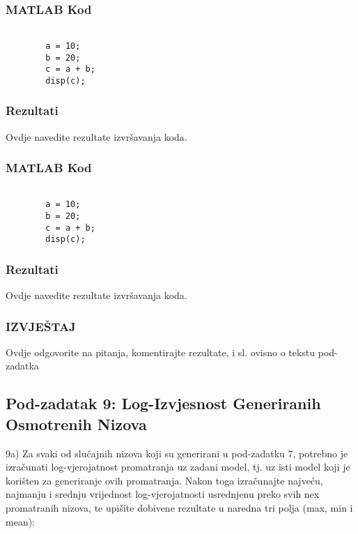 \documentclass[12pt]{article}
\begin{document}
	\subsubsection*{MATLAB Kod}
	\begin{lstlisting}
		
		a = 10;
		b = 20;
		c = a + b;
		disp(c);
	\end{lstlisting}
	
	\subsubsection*{Rezultati}
	Ovdje navedite rezultate izvršavanja koda.\newline
	
	\subsubsection*{MATLAB Kod}
	\begin{lstlisting}
		
		a = 10;
		b = 20;
		c = a + b;
		disp(c);
	\end{lstlisting}
	
	\subsubsection*{Rezultati}
	Ovdje navedite rezultate izvršavanja koda.\newline
	
	\subsubsection*{IZVJEŠTAJ}
	Ovdje odgovorite na pitanja, komentirajte rezultate, i sl. ovisno o tekstu pod-zadatka
	
	\subsection{Pod-zadatak 9: Log-Izvjesnost Generiranih Osmotrenih Nizova}
	9a) Za svaki od slučajnih nizova koji su generirani u pod-zadatku 7, potrebno je izračunati log-vjerojatnost promatranja uz zadani model, tj. uz isti model koji je korišten za generiranje ovih promatranja. Nakon toga izračunajte najveću, najmanju i srednju vrijednost log-vjerojatnosti usrednjenu preko svih nex promatranih nizova, te upišite dobivene rezultate u naredna tri polja (max, min i mean):
	
\end{document}
